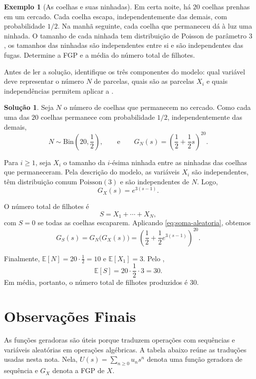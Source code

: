 \documentclass[12pt,portuguese]{article}
\theoremstyle{definition}
\newtheorem{example}[example]{Exemplo}
\theoremstyle{plainexercise}
\theoremstyle{starredexercise}
\theoremstyle{definition}
\newtheorem*{solution}{Solução}
\begin{document}
\begin{example}[As coelhas e suas ninhadas]
\label{ex:coelhas-soma-aleatoria}
Em certa noite, há $20$ coelhas prenhas em um cercado. Cada coelha escapa,
independentemente das demais, com probabilidade $1/2$. Na manhã seguinte,
cada coelha que permaneceu dá à luz uma ninhada. O tamanho de cada ninhada
tem distribuição de Poisson de parâmetro $3$, os tamanhos das ninhadas são
independentes entre si e são independentes das fugas. Determine a FGP e a
média do número total de filhotes.

Antes de ler a solução, identifique os três componentes do modelo: qual
variável deve representar o número $N$ de parcelas, quais são as parcelas
$X_i$ e quais independências permitem aplicar a
.

\begin{solution}
Seja $N$ o número de coelhas que permanecem no cercado. Como cada uma das
$20$ coelhas permanece com probabilidade $1/2$, independentemente das demais,
\[
N\sim\mathrm{Bin}\left(20,\frac12\right),
\qquad\text{e}\qquad
G_N(s)=\left(\frac12+\frac12s\right)^{20}.
\]

Para $i\geqslant1$, seja $X_i$ o tamanho da $i$-ésima ninhada entre as
ninhadas das coelhas que permaneceram. Pela descrição do modelo, as variáveis
$X_i$ são independentes, têm distribuição comum
$\mathrm{Poisson}(3)$ e são independentes de $N$. Logo,
\[
G_X(s)=e^{3(s-1)}.
\]

O número total de filhotes é
\[
S=X_1+\cdots+X_N,
\]
com $S=0$ se todas as coelhas escaparem. Aplicando
\eqref{eq:soma-aleatoria}, obtemos
\[
G_S(s)
=G_N\bigl(G_X(s)\bigr)
=\left(\frac12+\frac12e^{3(s-1)}\right)^{20}.
\]

Finalmente, $\mathbb{E}[N]=20\cdot\tfrac12=10$ e
$\mathbb{E}[X_1]=3$. Pelo ,
\[
\mathbb{E}[S]
=20\cdot\frac12\cdot3
=30.
\]
Em média, portanto, o número total de filhotes produzidos é $30$.
\end{solution}
\end{example}

\section{Observações Finais}
\label{sec:sintese-funcoes-geradoras}

As funções geradoras são úteis porque traduzem operações com sequências e
variáveis aleatórias em operações algébricas. A tabela abaixo reúne as
traduções usadas nesta nota. Nela, $U(s)=\sum_{n\geqslant 0}u_ns^n$ denota
uma função geradora de sequência e $G_X$ denota a FGP de $X$.
\end{document}
